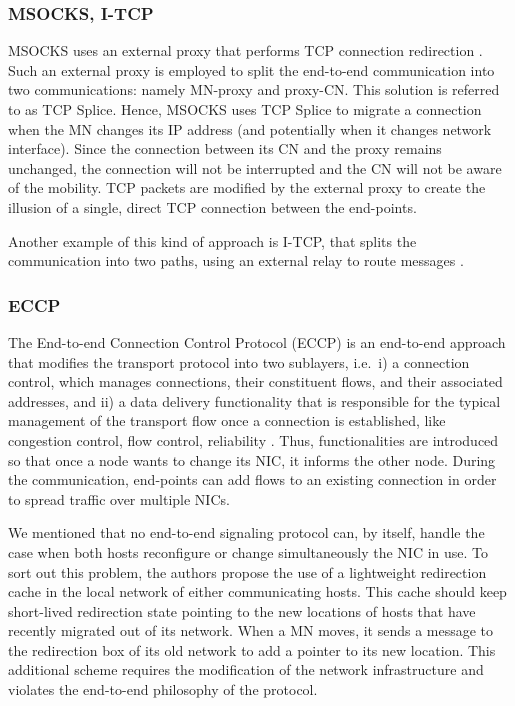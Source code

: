 \documentclass[preprint,12pt]{elsarticle}
\begin{document}
\subsubsection{MSOCKS, I-TCP}
MSOCKS uses an external proxy that performs TCP connection redirection \cite{msocks}. 
Such an external proxy is employed to split the end-to-end communication into 
two communications: namely MN-proxy and proxy-CN. This solution is referred to as TCP Splice. Hence, MSOCKS 
uses TCP Splice to migrate a connection when the MN changes its IP address (and 
potentially when it changes network interface). Since the connection between its 
CN and the proxy remains unchanged, the connection will not be interrupted and 
the CN will not be aware of the mobility. TCP packets are modified by the 
external proxy to create the illusion of a single, direct TCP connection between 
the end-points. 

Another example of this kind of approach is I-TCP, that splits the communication into two paths, using an external relay to route messages \cite{itcp}.

\subsubsection{ECCP}
The End-to-end Connection Control Protocol (ECCP) is an end-to-end approach 
that modifies the transport protocol into two sublayers, i.e.~i) a connection 
control, which manages connections, their constituent flows, and their
associated addresses, and ii) a data delivery functionality that is responsible for the typical management of the transport flow once a connection is established, like congestion control, flow control, reliability \cite{eccp}.
Thus, functionalities are introduced so that once a node wants to change its NIC, it informs the other node.
During the communication, end-points can add flows to an existing connection
in order to spread traffic over multiple NICs.

We mentioned that no end-to-end signaling
protocol can, by itself, handle the case when both hosts
reconfigure or change simultaneously the NIC in use.
To sort out this problem, the authors propose the use of a lightweight redirection cache in the local network
of either communicating hosts. This cache should keep short-lived
redirection state pointing to the new locations of hosts that
have recently migrated out of its network. When a MN moves, it sends a message to the
redirection box of its old network to add a pointer to its new
location. This additional scheme requires the modification of the network infrastructure and violates the end-to-end philosophy of the protocol.
\end{document}
